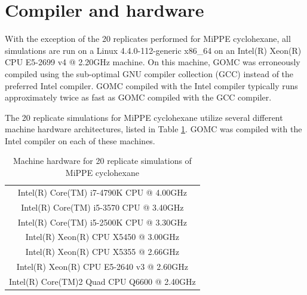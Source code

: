 \documentclass[journal=jctc,manuscript=article]{achemso}
\begin{document}
\newpage
\clearpage

\section{Compiler and hardware} \label{SI sec: Machine hardward}

With the exception of the 20 replicates performed for MiPPE cyclohexane, all simulations are run on a Linux 4.4.0-112-generic x86\_64 on an Intel(R) Xeon(R) CPU E5-2699 v4 @ 2.20GHz machine. On this machine, GOMC was erroneously compiled using the sub-optimal GNU compiler collection (GCC) instead of the preferred Intel compiler. GOMC compiled with the Intel compiler typically runs approximately twice as fast as GOMC compiled with the GCC compiler.

The 20 replicate simulations for MiPPE cyclohexane utilize several different machine hardware architectures, listed in Table \ref{SI tab: Machine hardware}. GOMC was compiled with the Intel compiler on each of these machines.

\begin{table}[htb!]
	\caption{Machine hardware for 20 replicate simulations of MiPPE cyclohexane} \label{SI tab: Machine hardware}
	\begin{center}
		\begin{tabular}{|c|}
			\hline
			Intel(R) Core(TM) i7-4790K CPU @ 4.00GHz \\
			Intel(R) Core(TM) i5-3570 CPU @ 3.40GHz \\
			Intel(R) Core(TM) i5-2500K CPU @ 3.30GHz \\
			Intel(R) Xeon(R) CPU X5450 @ 3.00GHz \\
			Intel(R) Xeon(R) CPU X5355 @ 2.66GHz \\
			Intel(R) Xeon(R) CPU E5-2640 v3 @ 2.60GHz \\
			Intel(R) Core(TM)2 Quad CPU Q6600 @ 2.40GHz \\
			\hline
		\end{tabular}
	\end{center}
\end{table}
\end{document}
